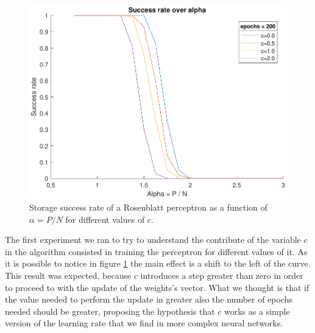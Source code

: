 \begin{figure}[t]
	\centering
	\includegraphics[width=\columnwidth]{figures/bonus_2_c}
    \caption{Storage success rate of a Rosenblatt perceptron as a function of $\alpha = P / N$ for different values of $c$.}
	\label{fig:multiple_c}
\end{figure}
The first experiment we ran to try to understand the contribute of the variable $c$ in the algorithm consisted in training the perceptron for different
values of it. As it is possible to notice in figure \ref{fig:multiple_c} the main effect is a shift to the left of the curve. This result was expected, because
$c$ introduces a step greater than zero in order to proceed to with the update of the weights's vector. What we thought is that if the value needed to perform
the update in greater also the number of epochs needed should be greater, proposing the hypothesis that $c$ works as a simple version of the learning rate that
we find in more complex neural networks.

